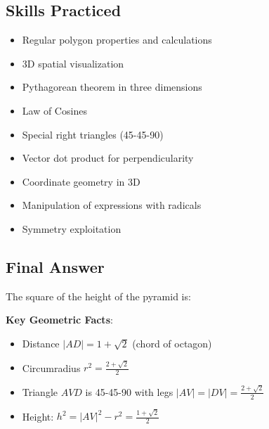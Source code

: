 \documentclass[12pt]{article}
\begin{document}
\subsection*{Skills Practiced}

\begin{itemize}
    \item Regular polygon properties and calculations
    \item 3D spatial visualization
    \item Pythagorean theorem in three dimensions
    \item Law of Cosines
    \item Special right triangles (45-45-90)
    \item Vector dot product for perpendicularity
    \item Coordinate geometry in 3D
    \item Manipulation of expressions with radicals
    \item Symmetry exploitation
\end{itemize}

\subsection*{Final Answer}

The square of the height of the pyramid is:

\begin{center}
\end{center}

\textbf{Key Geometric Facts}:
\begin{itemize}
    \item Distance $|AD| = 1 + \sqrt{2}$ (chord of octagon)
    \item Circumradius $r^2 = \frac{2+\sqrt{2}}{2}$
    \item Triangle $AVD$ is 45-45-90 with legs $|AV| = |DV| = \frac{2+\sqrt{2}}{2}$
    \item Height: $h^2 = |AV|^2 - r^2 = \frac{1+\sqrt{2}}{2}$ \checkmark
\end{itemize}
\end{document}
